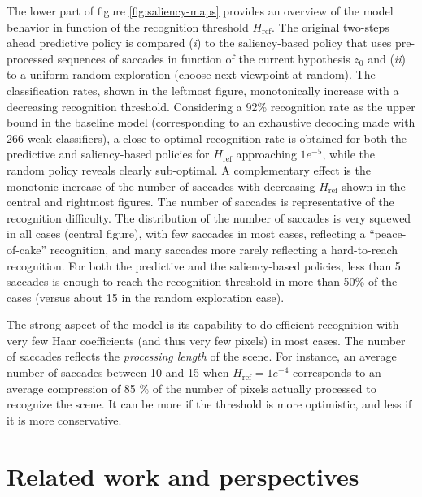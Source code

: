 \documentclass{article} %
\begin{document}
The lower part of figure \ref{fig:saliency-maps} provides an overview of the model behavior in function of the recognition threshold $H_\text{ref}$. The original two-steps ahead predictive policy is compared (\textit{i}) to the saliency-based policy that uses pre-processed sequences of saccades in function of the current hypothesis $z_0$ and (\textit{ii}) to a uniform random exploration (choose next viewpoint at random). The classification rates, shown in the leftmost figure, monotonically increase with a decreasing recognition threshold. Considering a 92\% recognition rate as the upper bound in the baseline model (corresponding to an exhaustive decoding made with 266 weak classifiers), a close to optimal recognition rate is obtained for both the predictive and saliency-based policies for $H_\text{ref}$ approaching $1e^{-5}$, while the random policy reveals clearly sub-optimal. A complementary effect is the monotonic increase of the number of saccades with decreasing $H_\text{ref}$ shown in the central and rightmost figures. The number of saccades is representative of the recognition difficulty. The distribution of the number of saccades is very squewed in all cases (central figure), with few saccades in most cases, reflecting a ``peace-of-cake'' recognition, and many saccades more rarely reflecting a hard-to-reach recognition. For both the predictive and the saliency-based policies, less than 5 saccades is enough to reach the recognition threshold in more than 50\% of the cases (versus about 15 in the random exploration case).  

The strong aspect of the model is its capability to do efficient recognition with very few Haar coefficients (and thus very few pixels) in most cases. The number of saccades  reflects the \textit{processing length} of the scene.  
For instance, an average number of saccades between 10 and 15 when $H_\text{ref} = 1e^{-4}$ corresponds to an average compression of 85 \% of the number of pixels actually processed to recognize the scene. It can be more if the threshold is more optimistic, and less if it is more conservative.   

\section{Related work and perspectives}
\end{document}
